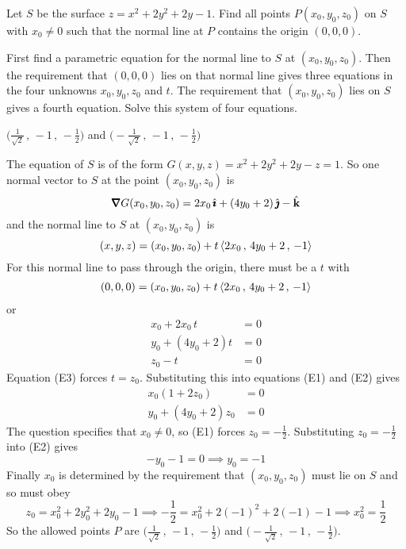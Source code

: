 \begin{question}[M200 2014D] %
Let $S$ be the surface $z = x^2 + 2y^2 + 2y - 1$. Find all points 
$P (x_0,y_0,z_0)$ on $S$ with $x_0 \ne 0$ such that the normal line 
at $P$ contains the origin $(0,0,0)$.
\end{question}

\begin{hint}
First find a parametric equation for the normal line to $S$ at $(x_0,y_0,z_0)$.
Then the requirement that $(0,0,0)$ lies on that normal line gives 
three equations in the four unknowns $x_0,y_0,z_0$ and $t$. The requirement
that $(x_0,y_0,z_0)$ lies on $S$ gives a fourth equation. Solve this system of four equations.
\end{hint}


\begin{answer}
$\big(\frac{1}{\sqrt{2}}\,,\,-1\,,\,-\frac{1}{2}\big)$
and 
  $\big(-\frac{1}{\sqrt{2}}\,,\,-1\,,\,-\frac{1}{2}\big)$
\end{answer}
\begin{solution}
The equation of $S$ is of the form $G(x,y,z) = x^2 + 2y^2 + 2y-z = 1$.
So one normal vector to $S$ at the point $(x_0,y_0,z_0)$ is 
\begin{equation*}
\vnabla G(x_0,y_0,z_0)  = 2x_0\,\hi + (4y_0+2)\,\hj -\hk
\end{equation*}
and the normal line to $S$ at $(x_0,y_0,z_0)$ is
\begin{equation*}
(x,y,z) = (x_0,y_0,z_0) +t\left< 2x_0\,,\,4y_0+2\,,\, -1\right>
\end{equation*}
For this normal line to pass through the origin, there must be a $t$
with
\begin{align*}
(0,0,0) = (x_0,y_0,z_0) +t\left< 2x_0\,,\,4y_0+2\,,\, -1\right>
\end{align*}
or
\begin{align*}
x_0 + 2x_0\,t & =0 \tag{E1}\\
y_0 +(4y_0+2)t &=0 \tag{E2}\\
z_0 -t &=0 \tag{E3}
\end{align*}
Equation (E3) forces $t=z_0$. Substituting this into equations (E1) and (E2)
gives
\begin{align*}
x_0(1+2z_0) & =0 \tag{E1}\\
y_0 +(4y_0+2)z_0 &=0 \tag{E2}
\end{align*}
The question specifies that $x_0\ne 0$, so (E1) forces $z_0=-\frac{1}{2}$.
Substituting $z_0=-\frac{1}{2}$ into (E2) gives
\begin{equation*}
-y_0-1=0 \implies y_0=-1
\end{equation*}
Finally $x_0$ is determined by the requirement that $(x_0,y_0,z_0)$
must lie on $S$ and so must obey
\begin{equation*}
z_0 = x_0^2 + 2y_0^2 + 2y_0 - 1
\implies -\frac{1}{2} = x_0^2 + 2(-1)^2 +2(-1)-1
\implies x_0^2 = \frac{1}{2}
\end{equation*}
So the allowed points $P$ are 
  $\big(\frac{1}{\sqrt{2}}\,,\,-1\,,\,-\frac{1}{2}\big)$
and 
  $\big(-\frac{1}{\sqrt{2}}\,,\,-1\,,\,-\frac{1}{2}\big)$.
\end{solution}



